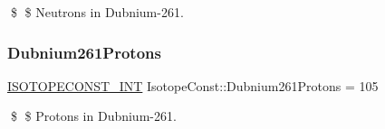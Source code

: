 \$ \$ Neutrons in Dubnium-\/261. \mbox{\label{group___isotope_const-_dubnium-_db261_gab82ca52a984afdc73462daf8d19b3681}} 
\subsubsection{\texorpdfstring{Dubnium261\+Protons}{Dubnium261Protons}}
{\footnotesize\ttfamily \mbox{\hyperlink{group___isotope_const-_macros_ga5f18360b3e99483a35c32d789e62621c}{I\+S\+O\+T\+O\+P\+E\+C\+O\+N\+S\+T\+\_\+\+I\+NT}} Isotope\+Const\+::\+Dubnium261\+Protons = 105}

\$ \$ Protons in Dubnium-\/261. 